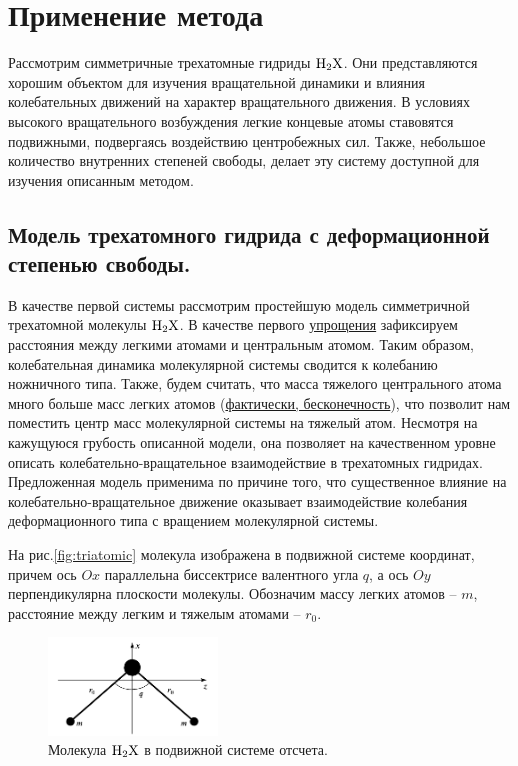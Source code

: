 \section{Применение метода}

Рассмотрим симметричные трехатомные гидриды $\ce{H2X}$. Они представляются хорошим объектом для изучения вращательной динамики и влияния колебательных движений на характер вращательного движения. В условиях высокого вращательного возбуждения легкие концевые атомы ставовятся подвижными, подвергаясь воздействию центробежных сил. Также, небольшое количество внутренних степеней свободы, делает эту систему доступной для изучения описанным методом. 

\subsection{Модель трехатомного гидрида с деформационной степенью свободы.}

В качестве первой системы рассмотрим простейшую модель симметричной трехатомной молекулы $\ce{H2X}$. В качестве первого \underline{упрощения} зафиксируем расстояния между легкими атомами и центральным атомом. Таким образом, колебательная динамика молекулярной системы сводится к колебанию ножничного типа. Также, будем считать, что масса тяжелого центрального атома много больше масс легких атомов (\underline{фактически, бесконечность}), что позволит нам поместить центр масс молекулярной системы на тяжелый атом. Несмотря на кажущуюся грубость описанной модели, она позволяет на качественном уровне описать колебательно-вращательное взаимодействие в трехатомных гидридах. Предложенная модель применима по причине того, что существенное влияние на колебательно-вращательное движение оказывает взаимодействие колебания деформационного типа с вращением молекулярной системы.

На рис.\eqref{fig:triatomic} молекула изображена в подвижной системе координат, причем ось $Ox$ параллельна биссектрисе валентного угла $q$, а ось $Oy$ перпендикулярна плоскости молекулы. Обозначим массу легких атомов -- $m$, расстояние между легким и тяжелым атомами -- $r_0$. 

\begin{figure}[!ht]
  \centering
	\includegraphics[width=0.4\textwidth]{../pictures/triatomic_fixed.png}
	\caption{Молекула $\ce{H2X}$ в подвижной системе отсчета.}
	\label{fig:triatomic}
\end{figure}

